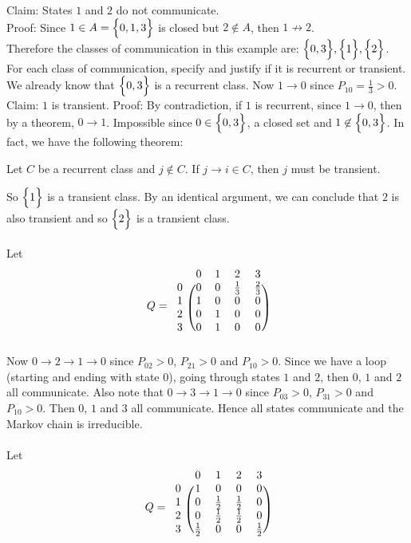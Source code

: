 \documentclass[12pt]{article}
\begin{document}
Claim: States $1$ and $2$ do not communicate. \\
Proof: Since $1 \in A = \Big\{ 0,1,3 \Big\}$ is closed but $2 \not\in A$, then $1 \not\to 2$.\\ 
Therefore the classes of communication in this example are: $\Big\{ 0,3 \Big\}, \Big\{ 1 \Big\}, \Big\{ 2 \Big\}$. \\
For each class of communication, specify and justify if it is recurrent or transient. \\
We already know that $\Big\{ 0,3 \Big\}$ is a recurrent class. Now $1 \to 0$ since $P_{10} = \frac{1}{3} > 0$. Claim: $1$ is transient. Proof: By contradiction, if $1$ is recurrent, since $1 \to 0$, then by a theorem, $0 \to 1$. Impossible since $ 0 \in \Big\{ 0,3 \Big\}$, a closed set and $1 \not\in \Big\{ 0,3 \Big\}$. In fact, we have the following theorem: 
\begin{theorem} Let $C$ be a recurrent class and $ j \not\in C$. If $ j \to i \in C$, then $j$ must be transient. \end{theorem} 
So $\Big\{ 1 \Big\}$ is a transient class. By an identical argument, we can conclude that $2$ is also transient and so $\Big\{ 2 \Big\}$ is a transient class. \\~\\
Let $$Q = \begin{blockarray}{ccccc}
&0&1&2&3 \\
\begin{block}{c(cccc)}
0 & 0 & 0 & \frac{1}{3} & \frac{2}{3} \\
1 & 1 & 0 & 0 & 0 \\ 
2 & 0 & 1 & 0 & 0 \\ 
3 & 0 & 1 & 0 & 0 \\ \end{block} \end{blockarray} $$
Now $0 \to 2 \to 1 \to 0$ since $P_{02} > 0$, $P_{21} > 0$ and $P_{10} > 0$. Since we have a loop (starting and ending with state $0$), going through states $1$ and $2$, then $0$, $1$ and $2$ all communicate. Also note that $0 \to 3 \to 1 \to 0$ since $P_{03} > 0$, $P_{31} > 0$ and $P_{10} > 0$. Then $0$, $1$ and $3$ all communicate. Hence all states communicate and the Markov chain is irreducible. \\~\\
Let $$Q = \begin{blockarray}{ccccc}
&0&1&2&3 \\
\begin{block}{c(cccc)}
0 & 1 & 0 & 0 & 0 \\
1 & 0 & \frac{1}{2} & \frac{1}{2} & 0 \\ 
2 & 0 & \frac{1}{2} & \frac{1}{2} & 0 \\ 
3 & \frac{1}{2} & 0 & 0 & \frac{1}{2} \\ \end{block} \end{blockarray} $$
\end{document}
